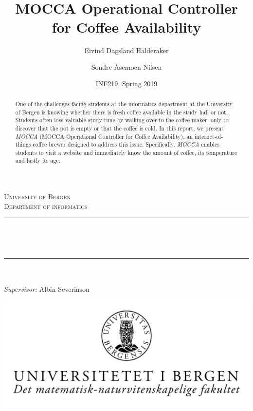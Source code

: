 \documentclass[12pt,a4paper,oneside,article]{memoir}
\title{MOCCA Operational Controller for Coffee Availability}
\author{Eivind Dagsland Halderaker \and Sondre Åsemoen Nilsen}
\date{INF219, Spring 2019}
\numberwithin{equation}{chapter}
\begin{document}
\begin{titlingpage}

\newcommand{\HRule}{\rule{\linewidth}{0.5mm}}
\centering

\textsc{\LARGE University of Bergen \\ Department of informatics}\\[1.5cm] %

\HRule\\[0.5cm]
\begin{Huge}
	\bfseries{\thetitle}\\[0.7cm]
\end{Huge}
\HRule\\[0.5cm]

{\large \theauthor}\\
{\large \emph{Supervisor:} Albin Severinson\\[2cm]}

\centerline{\includegraphics[scale=1.9]{figures/canvasWithFaculty}}
{\large \thedate}\\[3cm]
\vfill

\begin{abstract}
One of the challenges facing students at the informatics department at the 
University of Bergen is knowing whether there is fresh coffee available in the 
study hall or not.  Students often lose valuable study time by walking over to 
the coffee maker, only to discover that the pot is empty or that the coffee is 
cold. In this report, we present \textit{MOCCA} (MOCCA Operational Controller 
for Coffee Availability), an internet-of-things coffee brewer designed to 
address this issue. Specifically, \textit{MOCCA} enables students to visit a 
website and immediately know the amount of coffee, its temperature and lastly 
its age.
\end{abstract}
\end{titlingpage}

\clearpage
\end{document}

